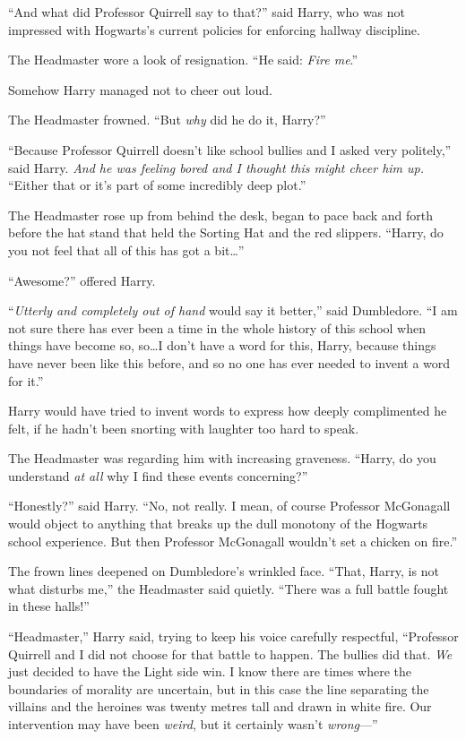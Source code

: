 “And what did Professor Quirrell say to that?” said Harry, who was not impressed with Hogwarts’s current policies for enforcing hallway discipline.

The Headmaster wore a look of resignation. “He said: \emph{Fire me}.”

Somehow Harry managed not to cheer out loud.

The Headmaster frowned. “But \emph{why} did he do it, Harry?”

“Because Professor Quirrell doesn’t like school bullies and I asked very politely,” said Harry. \emph{And he was feeling bored and I thought this might cheer him up.} “Either that or it’s part of some incredibly deep plot.”

The Headmaster rose up from behind the desk, began to pace back and forth before the hat stand that held the Sorting Hat and the red slippers. “Harry, do you not feel that all of this has got a bit…”

“Awesome?” offered Harry.

“\emph{Utterly and completely out of hand} would say it better,” said Dumbledore. “I am not sure there has ever been a time in the whole history of this school when things have become so, so…I don’t have a word for this, Harry, because things have never been like this before, and so no one has ever needed to invent a word for it.”

Harry would have tried to invent words to express how deeply complimented he felt, if he hadn’t been snorting with laughter too hard to speak.

The Headmaster was regarding him with increasing graveness. “Harry, do you understand \emph{at all} why I find these events concerning?”

“Honestly?” said Harry. “No, not really. I mean, of course Professor McGonagall would object to anything that breaks up the dull monotony of the Hogwarts school experience. But then Professor McGonagall wouldn’t set a chicken on fire.”

The frown lines deepened on Dumbledore’s wrinkled face. “That, Harry, is not what disturbs me,” the Headmaster said quietly. “There was a full battle fought in these halls!”

“Headmaster,” Harry said, trying to keep his voice carefully respectful, “Professor Quirrell and I did not choose for that battle to happen. The bullies did that. \emph{We} just decided to have the Light side win. I know there are times where the boundaries of morality are uncertain, but in this case the line separating the villains and the heroines was twenty metres tall and drawn in white fire. Our intervention may have been \emph{weird}, but it certainly wasn’t \emph{wrong}—”

